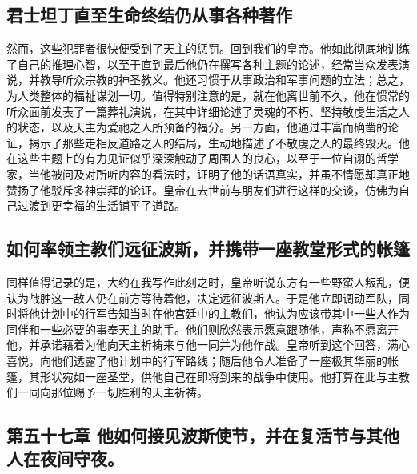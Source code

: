 
\subsection{君士坦丁直至生命终结仍从事各种著作}

然而，这些犯罪者很快便受到了天主的惩罚。回到我们的皇帝。他如此彻底地训练了自己的推理心智，以至于直到最后他仍在撰写各种主题的论述，经常当众发表演说，并教导听众宗教的神圣教义。他还习惯于从事政治和军事问题的立法；总之，为人类整体的福祉谋划一切。值得特别注意的是，就在他离世前不久，他在惯常的听众面前发表了一篇葬礼演说，在其中详细论述了灵魂的不朽、坚持敬虔生活之人的状态，以及天主为爱祂之人所预备的福分。另一方面，他通过丰富而确凿的论证，揭示了那些走相反道路之人的结局，生动地描述了不敬虔之人的最终毁灭。他在这些主题上的有力见证似乎深深触动了周围人的良心，以至于一位自诩的哲学家，当他被问及对所听内容的看法时，证明了他的话语真实，并虽不情愿却真正地赞扬了他驳斥多神崇拜的论证。皇帝在去世前与朋友们进行这样的交谈，仿佛为自己过渡到更幸福的生活铺平了道路。\par


\subsection{如何率领主教们远征波斯，并携带一座教堂形式的帐篷}

同样值得记录的是，大约在我写作此刻之时，皇帝听说东方有一些野蛮人叛乱，便认为战胜这一敌人仍在前方等待着他，决定远征波斯人。于是他立即调动军队，同时将他计划中的行军告知当时在他宫廷中的主教们，他认为应该带其中一些人作为同伴和一些必要的事奉天主的助手。他们则欣然表示愿意跟随他，声称不愿离开他，并承诺藉着为他向天主祈祷来与他一同并为他作战。皇帝听到这个回答，满心喜悦，向他们透露了他计划中的行军路线；随后他令人准备了一座极其华丽的帐篷，其形状宛如一座圣堂，供他自己在即将到来的战争中使用。他打算在此与主教们一同向那位赐予一切胜利的天主祈祷。\par


\subsection{第五十七章 他如何接见波斯使节，并在复活节与其他人在夜间守夜。}

